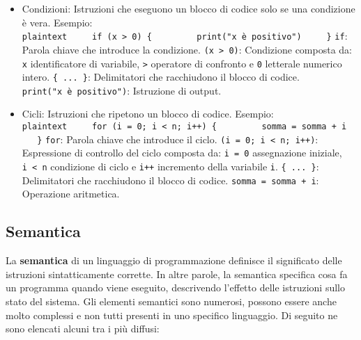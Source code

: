 \documentclass[
  letterpaper,
  DIV=11,
  numbers=noendperiod]{scrreprt}
\providecommand{\tightlist}{%
  \setlength{\itemsep}{0pt}\setlength{\parskip}{0pt}}\usepackage{longtable,booktabs,array}
\begin{document}
\begin{itemize}
\tightlist
\item
  Condizioni: Istruzioni che eseguono un blocco di codice solo se una
  condizione è vera. Esempio:
  \texttt{plaintext\ \ \ \ \ if\ (x\ \textgreater{}\ 0)\ \{\ \ \ \ \ \ \ \ \ print("x\ è\ positivo")\ \ \ \ \ \}}
  \texttt{if}: Parola chiave che introduce la condizione.
  \texttt{(x\ \textgreater{}\ 0)}: Condizione composta da: \texttt{x}
  identificatore di variabile, \texttt{\textgreater{}} operatore di
  confronto e \texttt{0} letterale numerico intero.
  \texttt{\{\ ...\ \}}: Delimitatori che racchiudono il blocco di
  codice. \texttt{print("x\ è\ positivo")}: Istruzione di output.
\item
  Cicli: Istruzioni che ripetono un blocco di codice. Esempio:
  \texttt{plaintext\ \ \ \ \ for\ (i\ =\ 0;\ i\ \textless{}\ n;\ i++)\ \{\ \ \ \ \ \ \ \ \ somma\ =\ somma\ +\ i\ \ \ \ \ \}}
  \texttt{for}: Parola chiave che introduce il ciclo.
  \texttt{(i\ =\ 0;\ i\ \textless{}\ n;\ i++)}: Espressione di controllo
  del ciclo composta da: \texttt{i\ =\ 0} assegnazione iniziale,
  \texttt{i\ \textless{}\ n} condizione di ciclo e \texttt{i++}
  incremento della variabile \texttt{i}. \texttt{\{\ ...\ \}}:
  Delimitatori che racchiudono il blocco di codice.
  \texttt{somma\ =\ somma\ +\ i}: Operazione aritmetica.
\end{itemize}

\subsection{Semantica}\label{semantica}

La \textbf{semantica} di un linguaggio di programmazione definisce il
significato delle istruzioni sintatticamente corrette. In altre parole,
la semantica specifica cosa fa un programma quando viene eseguito,
descrivendo l'effetto delle istruzioni sullo stato del sistema. Gli
elementi semantici sono numerosi, possono essere anche molto complessi e
non tutti presenti in uno specifico linguaggio. Di seguito ne sono
elencati alcuni tra i più diffusi:
\end{document}
